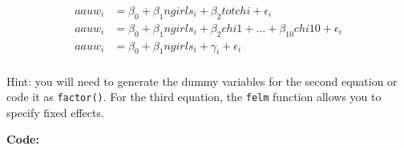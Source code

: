 \documentclass[
]{article}
\newenvironment{Shaded}{\begin{snugshade}}{\end{snugshade}}
\newcommand{\AttributeTok}[1]{\textcolor[rgb]{0.13,0.29,0.53}{#1}}
\newcommand{\ConstantTok}[1]{\textcolor[rgb]{0.56,0.35,0.01}{#1}}
\newcommand{\FloatTok}[1]{\textcolor[rgb]{0.00,0.00,0.81}{#1}}
\newcommand{\FunctionTok}[1]{\textcolor[rgb]{0.13,0.29,0.53}{\textbf{#1}}}
\newcommand{\NormalTok}[1]{#1}
\newcommand{\OtherTok}[1]{\textcolor[rgb]{0.56,0.35,0.01}{#1}}
\newcommand{\SpecialCharTok}[1]{\textcolor[rgb]{0.81,0.36,0.00}{\textbf{#1}}}
\newcommand{\StringTok}[1]{\textcolor[rgb]{0.31,0.60,0.02}{#1}}
\begin{document}
\[
\begin{aligned}
 aauw_i&=\beta_0+\beta_1ngirls_i+\beta_2totchi+\epsilon_i\\
  aauw_i&=\beta_0+\beta_1ngirls_i+\beta_2chi1+...+\beta_{10}chi10 +\epsilon_i\\
    aauw_i&=\beta_0+\beta_1ngirls_i+\gamma_i+\epsilon_i\\
\end{aligned}
\]

Hint: you will need to generate the dummy variables for the second
equation or code it as \texttt{factor()}. For the third equation, the
\texttt{felm} function allows you to specify fixed effects.

\textbf{Code:}

\begin{Shaded}
\end{Shaded}
\end{document}
